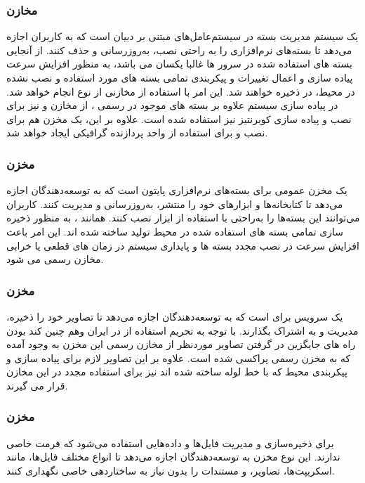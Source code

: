 \subsubsection{مخازن }
یک سیستم مدیریت بسته در سیستم‌عامل‌های مبتنی بر دبیان است که به کاربران اجازه می‌دهد تا بسته‌های نرم‌افزاری را به راحتی نصب، به‌روزرسانی و حذف کنند. از آنجایی بسته های استفاده شده در سرور ها غالبا یکسان می باشد، به منظور افزایش سرعت پیاده سازی و اعمال تغییرات و پیکربندی تمامی بسته های مورد استفاده و نصب نشده در محیط، در  ذخیره خواهند شد. این امر با استفاده از مخازنی از نوع  انجام خواهد شد. در پیاده سازی سیستم علاوه بر بسته های موجود در  رسمی ، از مخازن  و  نیز برای نصب و پیاده سازی کوبرنتیز نیز استفاده شده است. علاوه بر این، یک مخزن هم برای نصب  و  برای استفاده از واحد پردازنده گرافیکی ایجاد خواهد شد.
\subsubsection{مخزن }
	یک مخزن عمومی برای بسته‌های نرم‌افزاری پایتون است که به توسعه‌دهندگان اجازه می‌دهد تا کتابخانه‌ها و ابزارهای خود را منتشر، به‌روزرسانی و مدیریت کنند. کاربران می‌توانند این بسته‌ها را به‌راحتی با استفاده از ابزار  نصب کنند. همانند ، به منظور ذخیره سازی تمامی بسته های استفاده شده در محیط تولید ساخته شده اند. این امر باعث افزایش سرعت در نصب مجدد بسته ها و پایداری سیستم در زمان های قطعی یا خرابی مخازن رسمی می شود.
\subsubsection{مخزن }
	یک سرویس برای  است که به توسعه‌دهندگان اجازه می‌دهد تا تصاویر خود را ذخیره، مدیریت و به اشتراک بگذارند. با توجه به تحریم استفاده از  در ایران وهم چنین کند بودن راه های جایگزین در گرفتن تصاویر موردنظر از مخازن رسمی این مخزن به وجود آمده که به مخزن رسمی  پراکسی شده است. علاوه بر این تصاویر لازم برای پیاده سازی و پیکربندی محیط که با خط لوله  ساخته شده اند نیز برای استفاده مجدد در این مخازن قرار می گیرند.
\subsubsection{مخزن }
	برای ذخیره‌سازی و مدیریت فایل‌ها و داده‌هایی استفاده می‌شود که فرمت خاصی ندارند. این نوع مخزن به توسعه‌دهندگان اجازه می‌دهد تا انواع مختلف فایل‌ها، مانند اسکریپت‌ها، تصاویر، و مستندات را بدون نیاز به ساختاردهی خاصی نگهداری کنند.


